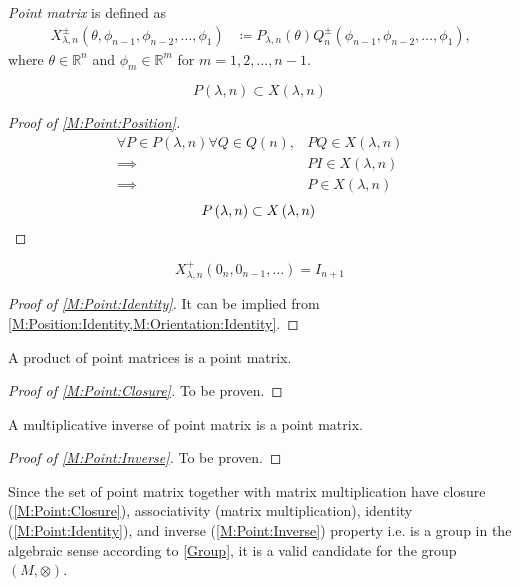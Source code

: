 \documentclass[../methodology.tex]{subfiles}
\begin{document}
\begin{definition}\label{M:Point}
    \textit{Point matrix} is defined as
    \begin{align*}
        X^{\pm}_{\lambda,n}\left(\theta,\phi_{n-1},\phi_{n-2},\dots,\phi_1\right) & \coloneqq
        P_{\lambda,n}\left(\theta\right)
        Q^{\pm}_n\left(\phi_{n-1},\phi_{n-2},\dots,\phi_1\right)\text{,}
    \end{align*}
    where \(\theta\in\mathbb{R}^n\) and \(\phi_m\in\mathbb{R}^m\) for \(m = 1, 2, \dots, n-1\).
\end{definition}
\begin{corollary}\label{M:Point:Position}
    \[
        P\left(\lambda,n\right)\subset X\left(\lambda,n\right)
    \]
\end{corollary}
\begin{proof}[Proof of \cref{M:Point:Position}]
    \begin{align*}
        \forall{P\in P\left(\lambda,n\right)}
        \forall{Q\in Q\left(n\right)},
         & P Q\in X\left(\lambda,n\right) \\
        \implies
         & P I\in X\left(\lambda,n\right) \\
        \implies
         & P\in X\left(\lambda,n\right)
    \end{align*}
    \[
        P\left(\lambda,n\right)\subset X\left(\lambda,n\right)\qedhere
    \]
\end{proof}
\begin{corollary}\label{M:Point:Identity}
    \[
        X^{+}_{\lambda,n}
        \left(0_{n}, 0_{n-1},\dots\right)
        =
        I_{n+1}
    \]
\end{corollary}
\begin{proof}[Proof of \cref{M:Point:Identity}]
    It can be implied from \cref{M:Position:Identity,M:Orientation:Identity}.
\end{proof}
\begin{corollary}\label{M:Point:Closure}
    A product of point matrices is a point matrix.
\end{corollary}
\begin{proof}[Proof of \cref{M:Point:Closure}]
    To be proven.
\end{proof}
\begin{corollary}\label{M:Point:Inverse}
    A multiplicative inverse of point matrix is a point matrix.
\end{corollary}
\begin{proof}[Proof of \cref{M:Point:Inverse}]
    To be proven.
\end{proof}
\begin{remark}\label{M:Group}
    Since the set of point matrix together with matrix multiplication
    have closure (\cref{M:Point:Closure}),
    associativity (matrix multiplication),
    identity (\cref{M:Point:Identity}),
    and inverse (\cref{M:Point:Inverse}) property
    i.e. is a group in the algebraic sense according to \cref{Group},
    it is a valid candidate for the group \(\left(M,\otimes\right)\).
\end{remark}
\end{document}
